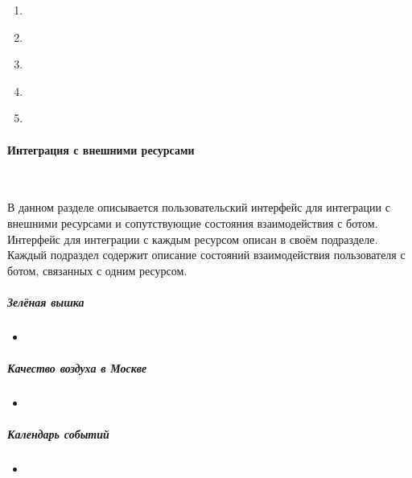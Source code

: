 \begin{enumerate}
            \item \label{itm:req:ui:states:feedback}

            \item \label{itm:req:ui:states:edit-note}

            \item \label{itm:req:ui:states:rename-kbo}

            \item \label{itm:req:ui:states:move-kbo}

            \item \label{itm:req:ui:states:delete-kbo}
        \end{enumerate}

        \paragraph{Интеграция с внешними ресурсами}
            \label{par:req:ui:states:integrations}
            ~\par
            В данном разделе описывается пользовательский интерфейс для интеграции с внешними
            ресурсами и сопутствующие состояния взаимодействия с ботом.
            Интерфейс для интеграции с каждым ресурсом описан в своём подразделе.
            Каждый подраздел содержит описание состояний взаимодействия пользователя с ботом,
            связанных с одним ресурсом.

            \subparagraph{Зелёная вышка}
                \begin{itemize}
                    \item
                \end{itemize}

            \subparagraph{Качество воздуха в Москве}
                \begin{itemize}
                    \item
                \end{itemize}

            \subparagraph{Календарь событий}
                \begin{itemize}
                    \item
                \end{itemize}
        \endgroup


